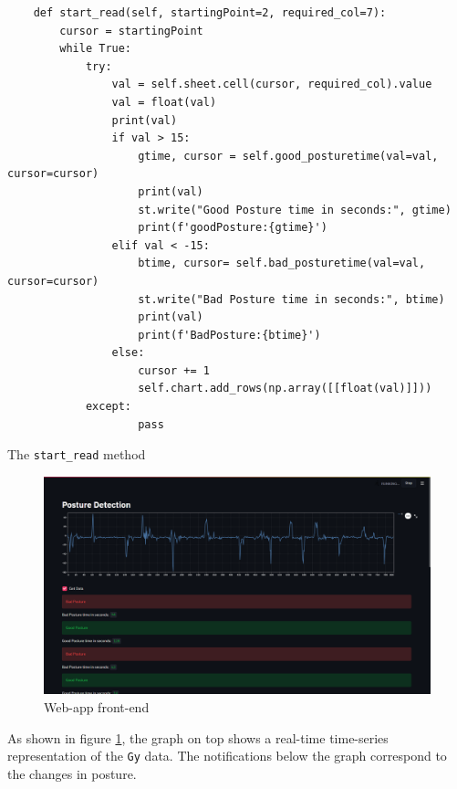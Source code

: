 \documentclass[a4paper,12pt]{report}
\newenvironment{code}{\captionsetup{type=listing}}{}
\begin{document}
\begin{code}
    \begin{verbatim}
    def start_read(self, startingPoint=2, required_col=7):
        cursor = startingPoint
        while True:
            try:
                val = self.sheet.cell(cursor, required_col).value
                val = float(val)
                print(val)
                if val > 15:
                    gtime, cursor = self.good_posturetime(val=val, cursor=cursor)
                    print(val)
                    st.write("Good Posture time in seconds:", gtime)
                    print(f'goodPosture:{gtime}')
                elif val < -15:
                    btime, cursor= self.bad_posturetime(val=val, cursor=cursor)
                    st.write("Bad Posture time in seconds:", btime)
                    print(val)
                    print(f'BadPosture:{btime}')
                else:
                    cursor += 1
                    self.chart.add_rows(np.array([[float(val)]]))
            except:
                    pass
    \end{verbatim}
    \caption{The \texttt{start_read} method}
    \label{code:start_read}
\end{code}

\begin{figure}[H]
    \center
    \includegraphics[scale=0.26]{../img/webappss2.png}
    \caption{Web-app front-end}
    \label{fig:webapp}
\end{figure}

As shown in figure \ref{fig:webapp}, the graph on top shows a real-time
time-series representation of the \texttt{Gy} data. The notifications below the
graph correspond to the changes in posture.
\end{document}
